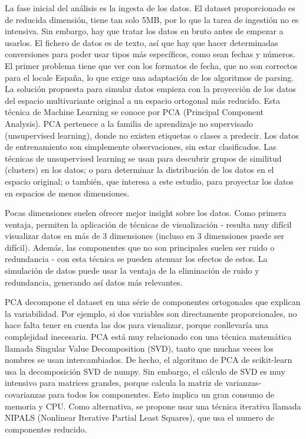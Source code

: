 \documentclass[11pt,spanish,listoffigures,listoftables]{tfgetsinf}
\begin{document}
La fase inicial del análisis es la ingesta de los datos. El dataset proporcionado es de reducida dimensión, tiene tan solo 5MB, por lo que la tarea de ingestión no es intensiva. Sin embargo, hay que tratar los datos en bruto antes de empezar a usarlos. El fichero de datos es de texto, así que hay que hacer determinadas conversiones para poder usar tipos más específicos, como sean fechas y números. El primer problema tiene que ver con los formatos de fecha, que no son correctos para el locale España, lo que exige una adaptación de los algoritmos de parsing.
La solución propuesta para simular datos empieza con la proyección de los datos del espacio multivariante original a un espacio ortogonal más reducido. Esta técnica de Machine Learning se conoce por PCA (Principal Component Analysis). PCA pertenece a la familia de aprendizaje no supervisado (unsupervised learning), donde no existen etiquetas o clases a predecir. Los datos de entrenamiento son simplemente observaciones, sin estar clasificados. Las técnicas de unsupervised learning se usan para descubrir grupos de similitud (clusters) en los datos; o para determinar la distribución de los datos en el espacio original; o también, que interesa a este estudio, para proyectar los datos en espacios de menos dimensiones.

Pocas dimensiones suelen ofrecer mejor insight sobre los datos. Como primera ventaja, permiten la aplicación de técnicas de visualización - resulta muy difícil visualizar datos en más de 3 dimensiones (incluso en 3 dimensiones puede ser difícil). Además, las componentes que no son principales suelen ser ruido o redundancia - con esta técnica se pueden atenuar los efectos de estos. La simulación de datos puede usar la ventaja de la eliminación de ruido y redundancia, generando así datos más relevantes.

PCA decompone el dataset en una série de componentes ortogonales que explican la variabilidad. Por ejemplo, si dos variables son directamente proporcionales, no hace falta tener en cuenta las dos para visualizar, porque conllevaría una complejidad inecesaria. PCA está muy relacionado con una técnica matemática llamada Singular Value Decomposition (SVD), tanto que muchas veces los nombres se usan intercambiados. De hecho, el algoritmo de PCA de scikit-learn usa la decomposición SVD de numpy. Sin embargo, el cálculo de SVD es muy intensivo para matrices grandes, porque calcula la matriz de varianzas-covarianzas para todos los componentes. Esto implica un gran consumo de memoria y CPU. Como alternativa, se propone usar una técnica iterativa llamada NIPALS (Nonlinear Iterative Partial Least Squares), que usa el numero de componentes reducido.
\end{document}
